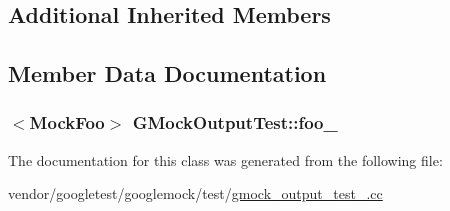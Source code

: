 \subsection*{Additional Inherited Members}


\subsection{Member Data Documentation}
\subsubsection[{\texorpdfstring{foo\+\_\+}{foo_}}]{$<${\bf Mock\+Foo}$>$ G\+Mock\+Output\+Test\+::foo\+\_\+\hspace{0.3cm}{\ttfamily [protected]}}\hypertarget{classGMockOutputTest_aed97d2ca515d69466968c60575cc18a2}{}\label{classGMockOutputTest_aed97d2ca515d69466968c60575cc18a2}


The documentation for this class was generated from the following file\+:\begin{DoxyCompactItemize}
\item 
vendor/googletest/googlemock/test/\hyperlink{gmock__output__test___8cc}{gmock\+\_\+output\+\_\+test\+\_\+.\+cc}\end{DoxyCompactItemize}

